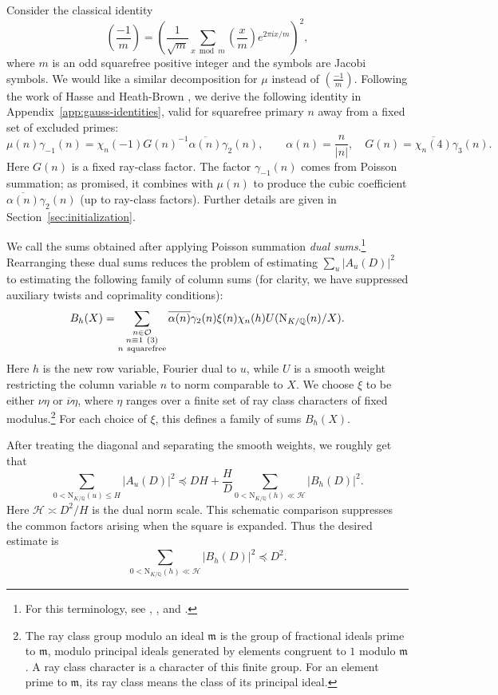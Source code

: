 \documentclass[11pt,a4paper]{article}
\numberwithin{equation}{section}
\numberwithin{figure}{section}
\theoremstyle{definition}
\theoremstyle{remark}
\newcommand{\Q}{\mathbb Q}
\newcommand{\NK}{\mathrm N_{K/\Q}}
\newcommand{\OO}{\mathcal O}
\newcommand{\precbd}{\preccurlyeq}
\begin{document}
Consider the classical identity
\[
 \left(\frac{-1}{m}\right)=\left(\frac{1}{\sqrt{m}}\sum_{x\bmod m}\left(\frac{x}{m}\right)e^{2\pi ix/m}\right)^2,
\]
where $m$ is an odd squarefree positive integer and the symbols are Jacobi symbols. We would like a similar decomposition for $\mu$ instead of $\left(\frac{-1}{m}\right)$. Following the work of Hasse \cite[pp.~443--445]{Has50} and Heath-Brown \cite[(2)]{HB00}, we derive the following identity in Appendix~\ref{app:gauss-identities}, valid for squarefree primary $n$ away from a fixed set of excluded primes:
\[
 \mu(n)\gamma_{-1}(n)=\chi_n(-1)G(n)^{-1}\overline{\alpha(n)}\gamma_2(n),
 \qquad \alpha(n)=\frac{n}{|n|},\quad G(n)=\overline{\chi_n(4)}\gamma_3(n).
\]
Here $G(n)$ is a fixed ray-class factor. The factor $\gamma_{-1}(n)$ comes from Poisson summation; as promised, it combines with $\mu(n)$ to produce the cubic coefficient $\overline{\alpha(n)}\gamma_2(n)$ (up to ray-class factors). Further details are given in Section~\ref{sec:initialization}.

We call the sums obtained after applying Poisson summation \emph{dual sums}.\footnote{For this terminology, see \cite[p.~440]{PY20},
\cite[\S2.3]{KLMS20}, and \cite[arXiv abstract]{FLN10}.} Rearranging these dual sums reduces the problem of estimating
$\sum_u |A_u(D)|^2$ to estimating the following family of column sums (for clarity, we have suppressed auxiliary twists and coprimality conditions):
\begin{equation}\label{eq:intro-gauss-family}
 B_h(X)=\sum_{\substack{n\in\OO\\n\equiv1\ (3)\\n\ {\rm squarefree}}}
       \overline{\alpha(n)}\gamma_2(n)\xi(n)\chi_n(h)
       U(\NK(n)/X).
\end{equation}
Here $h$ is the new row variable, Fourier dual to $u$, while $U$ is a smooth weight restricting the column variable $n$ to norm comparable to $X$. We choose $\xi$ to be either $\nu\eta$ or $\overline{\nu}\eta$, 
where $\eta$ ranges over a finite set of ray class characters of fixed modulus.\footnote{The ray class group modulo an ideal $\mathfrak m$ is the group of fractional ideals prime to $\mathfrak m$, modulo principal ideals generated by elements congruent to $1$ modulo $\mathfrak m$. A ray class character is a character of this finite group. For an element prime to $\mathfrak m$, its ray class means the class of its principal ideal.}  For each choice of $\xi$, this defines a family of sums $B_h(X)$.

 After treating the diagonal and separating the smooth weights, we roughly get that
\begin{equation}\label{eq:intro-poisson-comparison}
 \sum_{0<\NK(u)\le H}|A_u(D)|^2
 \precbd DH+\frac HD
       \sum_{0<\NK(h)\ll\mathcal H}|B_h(D)|^2.
\end{equation}
Here $\mathcal H\asymp D^2/H$ is the dual norm scale. This schematic
comparison suppresses the common factors arising when the square is
expanded. Thus the desired estimate is
\begin{equation}\label{eq:intro-dual-ms}
 \sum_{0<\NK(h)\ll\mathcal H}|B_h(D)|^2\precbd D^2.
\end{equation}
\end{document}
